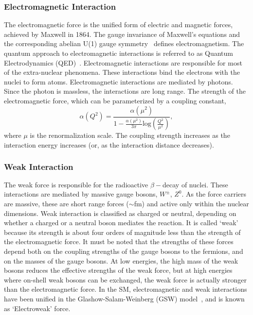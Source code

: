 \subsubsection{Electromagnetic Interaction}
The electromagnetic force is the unified form of electric and magnetic forces, achieved by Maxwell in 1864. The gauge invariance of Maxwell's 
equations and the corresponding abelian U(1) gauge symmetry~\cite{Fock:1926fj} defines electromagnetism. The quantum approach to electromagnetic 
interactions is referred to as Quantum Electrodynamics (\gls{QED})~\cite{Feynman:1948ur,Feynman:1948km,Tomonaga:1948zz,Schwinger:1948iu,Schwinger:1948yk,Dyson:1949bp,Peskin:1995ev}.
Electromagnetic interactions are responsible for most of the extra-nuclear phenomena. These interactions bind the electrons with the nuclei 
to form atoms. Electromagnetic interactions are mediated by photons. Since the photon is massless, the interactions are long range.
The strength of the electromagnetic force, which can be parameterized by a coupling constant,
\begin{equation}
\alpha(Q^{2})= \frac{\alpha(\mu^{2})}{ 1 - \frac{\alpha(\mu^{2})}{3\pi}\text{log}\left(\frac{Q^{2}}{\mu^{2}}\right)},
\label{eg:QEDalpha}
\end{equation}
where $\mu$ is the renormalization scale. The coupling strength increases as the interaction energy increases (or, as the interaction distance decreases).

\subsubsection{Weak Interaction}
The weak force is responsible for the radioactive $\beta-$decay of nuclei.
These interactions are mediated by massive gauge bosons, $W^{\pm}$, $Z^{0}$. As the force carriers are massive, these are short range 
forces ($\sim$fm) and active only within the nuclear dimensions. Weak interaction is classified as charged or neutral, depending on whether
a charged or a neutral boson mediates the reaction. It is called `weak' because its strength is about four orders of magnitude less than the 
strength of the electromagnetic force. It must be noted that the strengths of these forces depend both on the coupling strengths of the gauge 
bosons to the fermions, and on the masses of the gauge bosons. At low energies, the high mass of  the weak bosons reduces the effective strengths 
of the weak force, but at high energies where on-shell weak bosons can be exchanged, the weak force is actually stronger than the electromagnetic
force. In the SM, electromagnetic and weak interactions have been unified in the Glashow-Salam-Weinberg (GSW) 
model~\cite{Glashow:1961tr,Salam:1964ry,Weinberg:1967tq}, and is known as `Electroweak' force.

